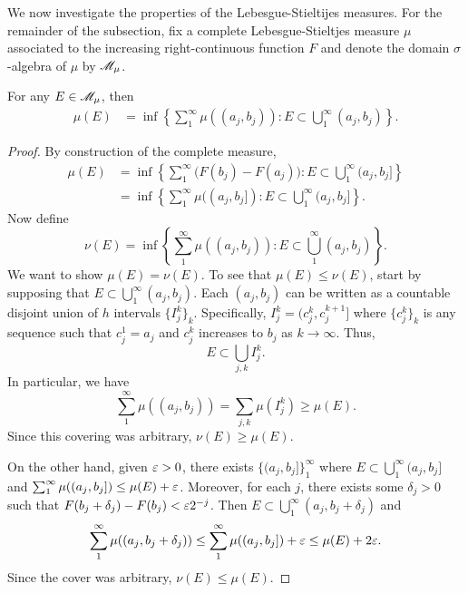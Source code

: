 \documentclass[12pt]{article} %
\begin{document}
We now investigate the properties of the Lebesgue-Stieltijes measures. For the remainder of the subsection, fix a complete Lebesgue-Stieltjes measure $\mu$ associated to the increasing right-continuous function $F$ and denote the domain $\sigma$-algebra of $\mu$ by $\mathscr{M}_\mu$.

\begin{lemma}\label{lem:lebesgue-stieltjes-alt-definition}
    For any $E \in \mathscr{M}_\mu$, then \begin{align*}
        \mu(E) &= \inf \left\{ \sum_1^\infty \mu((a_j, b_j)) : E \subset \bigcup_1^\infty (a_j, b_j) \right\}.
    \end{align*}
\end{lemma}

\begin{proof}
    By construction of the complete measure, \begin{align*}
        \mu(E) &= \inf \left\{ \sum_1^\infty \Big(F(b_j) - F(a_j) \Big) : E \subset \bigcup_1^\infty (a_j, b_j] \right\}\\
        &= \inf \left\{ \sum_1^\infty \mu((a_j, b_j]) : E \subset \bigcup_1^\infty (a_j, b_j] \right\}.
    \end{align*}
    Now define \[\nu(E) = \inf \left\{ \sum_1^\infty \mu((a_j, b_j)) : E \subset \bigcup_1^\infty (a_j, b_j) \right\}.\] We want to show $\mu(E) = \nu(E)$. To see that $\mu(E) \leq \nu(E)$, start by supposing that $E \subset \bigcup_1^{\infty} (a_j, b_j)$. Each $(a_j, b_j)$ can be written as a countable disjoint union of $h$ intervals $\{I_j^k\}_k$. Specifically, $I_j^k = (c_j^k, c_j^{k+1}]$ where $\{c_j^k\}_k$ is any sequence such that $c_j^1 = a_j$ and $c_j^k$ increases to $b_j$ as $k \to \infty$. Thus, \[E \subset \bigcup_{j, k} I_j^k.\] In particular, we have \[\sum_1^{\infty} \mu((a_j, b_j)) = \sum_{j, k} \mu(I_j^k) \geq \mu(E).\] Since this covering was arbitrary, $\nu(E) \geq \mu(E)$.

    On the other hand, given $\varepsilon > 0$, there exists $\{(a_j, b_j]\}_1^{\infty}$ where $E \subset \bigcup_1^{\infty} (a_j, b_j]$ and $\sum_1^{\infty} \mu((a_j, b_j]) \leq \mu(E) + \varepsilon$. Moreover, for each $j$, there exists some $\delta_j > 0$ such that $F(b_j + \delta_j) - F(b_j) < \varepsilon 2^{-j}$. Then $E \subset \bigcup_1^{\infty} (a_j, b_j + \delta_j)$ and \[\sum_1^\infty \mu((a_j, b_j + \delta_j)) \leq \sum_1^\infty \mu((a_j, b_j]) + \varepsilon \leq \mu(E) + 2\varepsilon.\] Since the cover was arbitrary, $\nu(E) \leq \mu(E)$.
\end{proof}
\end{document}
